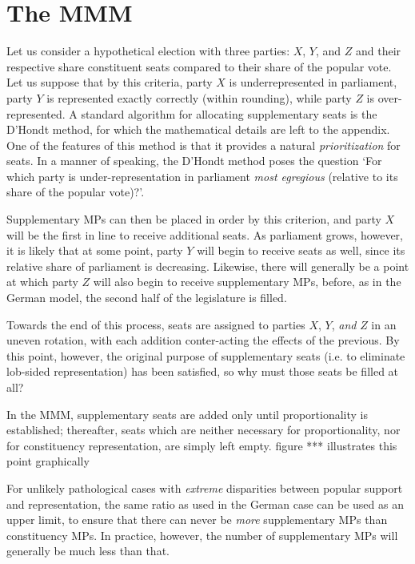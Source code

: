 \documentclass[DIV=calc, paper=a4, fontsize=11pt, twocolumn]{scrartcl}	 %
\begin{document}
\section{The MMM}
\label{sec:model_proposal}

Let us consider a hypothetical election with three parties: $X$, $Y$, and $Z$ and their respective share constituent seats compared to their share of the popular vote. Let us suppose that by this criteria, party $X$ is underrepresented in parliament, party $Y$ is represented exactly correctly (within rounding), while party $Z$ is over-represented. 
A standard algorithm for allocating supplementary seats is the D'Hondt method, for which the mathematical details are left to the appendix. One of the features of this method is that it provides a natural \emph{prioritization} for seats. In a manner of speaking, the D'Hondt method poses the question `For which party is under-representation in parliament \emph{most egregious} (relative to its share of the popular vote)?'. 

Supplementary MPs can then be placed in order by this criterion, and party $X$ will be the first in line to receive additional seats. As parliament grows, however, it is likely that at some point, party $Y$ will begin to receive seats as well, since its relative share of parliament is decreasing. Likewise, there will generally be a point at which party $Z$ will also begin to receive supplementary MPs, before, as in the German model, the second half of the legislature is filled. 

Towards the end of this process, seats are assigned to parties $X$, $Y$, \emph{and} $Z$ in an uneven rotation, with each addition conter-acting the effects of the previous. By this point, however, the original purpose of supplementary seats (i.e. to eliminate lob-sided representation) has been satisfied, so why must those seats be filled at all?

In the MMM, supplementary seats are added only until proportionality is established; thereafter, seats which are neither necessary for proportionality, nor for constituency representation, are simply left empty. {\color{red} figure ***  illustrates this point graphically}

For unlikely pathological cases with \emph{extreme} disparities between popular support and representation, the same ratio as used in the German case can be used as an upper limit, to ensure that there can never be \emph{more} supplementary MPs than constituency MPs. In practice, however, the number of supplementary MPs will generally be much less than that.
\end{document}
